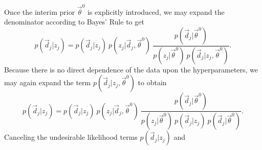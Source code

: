 \documentclass[preprint]{aastex}
\begin{document}
Once the interim prior $\vec{\theta}^{0}$ is explicitly introduced, we may 
expand the denominator according to Bayes' Rule to get 
\begin{equation}\label{eq:expand} p(\vec{d}_{j}|z_{j}) = p(\vec{d}_{j}|z_{j})\ 
p(z_{j}|\vec{d}_{j},\vec{\theta}^{0})\ 
\frac{p(\vec{d}_{j}|\vec{\theta}^{0})}{p(z_{j}|\vec{\theta}^{0})\ 
p(\vec{d}_{j}|z_{j},\vec{\theta}^{0})}.\end{equation}  Because there is no 
direct dependence of the data upon the hyperparameters, we may again expand the 
term $p(\vec{d}_{j}|z_{j},\vec{\theta}^{0})$ to obtain 
\begin{equation}\label{eq:indterm} p(\vec{d}_{j}|z_{j}) = p(\vec{d}_{j}|z_{j})\ 
p(z_{j}|\vec{d}_{j},\vec{\theta}^{0})\ 
\frac{p(\vec{d}_{j}|\vec{\theta}^{0})}{p(z_{j}|\vec{\theta}^{0})\ 
p(\vec{d}_{j}|z_{j})\ p(\vec{d}_{j}|\vec{\theta}^{0})}.\end{equation}  
Canceling the undesirable likelihood terms $p(\vec{d}_{j}|z_{j})$ and 
\end{document}
